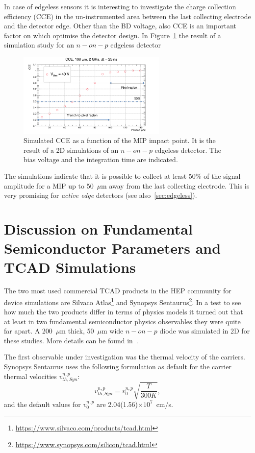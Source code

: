 In case of edgeless sensors it is interesting to investigate the charge collection efficiency (CCE) 
in the un-instrumented area between the last collecting electrode and the detector edge. 
Other than the BD voltage, also CCE is an important factor on which optimise the 
detector design. In Figure~\ref{fig:Edgeless_CCE} the result of a simulation study for an 
$n-on-p$ edgeless detector 
\begin{figure}[!htbp]
\centering
\includegraphics[width=0.65\textwidth]{Edgeless_CCE.png}
\caption{\label{fig:Edgeless_CCE}Simulated CCE as a function of the MIP impact point. 
It is the result of a 2D simulations of an $n-on-p$ edgeless detector. The bias voltage and the integration time 
are indicated.}
\end{figure}

The simulations indicate that it is possible to collect at least 50\% of the signal amplitude for a MIP 
up to 50~$\mu$m away from the last collecting electrode. This is very promising for {\it active edge} 
detectors  (see also~\ref{sec:edgeless}).

\section{Discussion on Fundamental  Semiconductor Parameters and TCAD Simulations}
\label{sec:TCADfund}
The two most used commercial TCAD products in the HEP community for device simulations 
are Silvaco Atlas\footnote{\url{https://www.silvaco.com/products/tcad.html}} and Synopsys 
Sentaurus\footnote{\url{https://www.synopsys.com/silicon/tcad.html}}.
In a test to see how much the two products differ in terms of physics models it turned out 
that at least in two fundamental semiconductor physics observables they were quite far apart. 
A  200~$\mu$m thick,  50~$\mu$m wide $n-on-p$ diode was simulated in 2D for these studies. More details can be found in~\cite{bomben_rd50_Torino}.



The first observable under investigation was the thermal velocity of the carriers. 
Synopsys Sentaurus uses the following formulation as default for the carrier thermal velocities $v_{th,Syn}^{n,p}$:
\begin{equation}
v_{th,Syn}^{n,p} = v_0^{n,p}\sqrt{\dfrac{T}{300 K}},
\label{eq:SynThVel}
\end{equation}
and the default values for $v_0^{n,p}$ are 2.04(1.56)$\times10^{7}$~cm/s.

